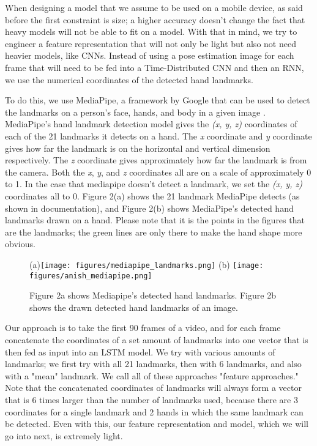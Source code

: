 \documentclass{article}
\begin{document}
When designing a model that we assume to be used on a mobile device, as said before the first constraint is size; a higher accuracy doesn't change the fact that heavy models will not be able to fit on a model. With that in mind, we try to engineer a feature representation that will not only be light but also not need heavier models, like CNNs. Instead of using a pose estimation image for each frame that will need to be fed into a Time-Distributed CNN and then an RNN, we use the numerical coordinates of the detected hand landmarks.

To do this, we use MediaPipe, a framework by Google that can be used to detect the landmarks on a person's face, hands, and body in a given image \cite{lugaresi2019mediapipe}. MediaPipe's hand landmark detection model gives the \emph{(x, y, z)} coordinates of each of the 21 landmarks it detects on a hand. The \emph{x} coordinate and \emph{y} coordinate gives how far the landmark is on the horizontal and vertical dimension respectively. The \emph{z} coordinate gives approximately how far the landmark is from the camera. Both the \emph{x}, \emph{y}, and \emph{z} coordinates all are on a scale of approximately 0 to 1. In the case that mediapipe doesn't detect a landmark, we set the \emph{(x, y, z)} coordinates all to 0. Figure 2(a) shows the 21 landmark MediaPipe detects (as shown in documentation), and Figure 2(b) shows MediaPipe's detected hand landmarks drawn on a hand. Please note that it is the points in the figures that are the landmarks; the green lines are only there to make the hand shape more obvious. 

\begin{figure}%
    \centering
    (a){{\texttt{[image: figures/mediapipe\_landmarks.png]} }}%
    \qquad
    (b) {{\texttt{[image: figures/anish\_mediapipe.png]} }}%
    \caption{Figure 2a shows Mediapipe's detected hand landmarks. Figure 2b shows the drawn detected hand landmarks of an image. }%
    \label{fig:example}%
\end{figure}

Our approach is to take the first 90 frames of a video, and for each frame concatenate the coordinates of a set amount of landmarks into one vector that is then fed as input into an LSTM model. We try with various amounts of landmarks; we first try with all 21 landmarks, then with 6 landmarks, and also with a "mean" landmark. We call all of these approaches "feature approaches." Note that the concatenated coordinates of landmarks will always form a vector that is 6 times larger than the number of landmarks used, because there are 3 coordinates for a single landmark and 2 hands in which the same landmark can be detected. Even with this, our feature representation and model, which we will go into next, is extremely light. 
\end{document}
